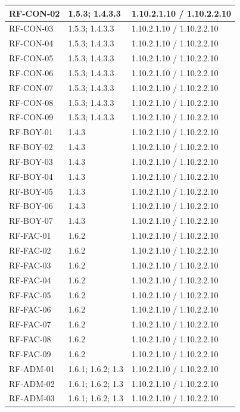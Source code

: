 \begin{longtable}{L{23mm}L{46mm}L{72mm}}
RF-CON-02 & 1.5.3; 1.4.3.3 & 1.10.2.1.10 / 1.10.2.2.10\\\hline
RF-CON-03 & 1.5.3; 1.4.3.3 & 1.10.2.1.10 / 1.10.2.2.10\\\hline
RF-CON-04 & 1.5.3; 1.4.3.3 & 1.10.2.1.10 / 1.10.2.2.10\\\hline
RF-CON-05 & 1.5.3; 1.4.3.3 & 1.10.2.1.10 / 1.10.2.2.10\\\hline
RF-CON-06 & 1.5.3; 1.4.3.3 & 1.10.2.1.10 / 1.10.2.2.10\\\hline
RF-CON-07 & 1.5.3; 1.4.3.3 & 1.10.2.1.10 / 1.10.2.2.10\\\hline
RF-CON-08 & 1.5.3; 1.4.3.3 & 1.10.2.1.10 / 1.10.2.2.10\\\hline
RF-CON-09 & 1.5.3; 1.4.3.3 & 1.10.2.1.10 / 1.10.2.2.10\\\hline
RF-BOY-01 & 1.4.3 & 1.10.2.1.10 / 1.10.2.2.10\\\hline
RF-BOY-02 & 1.4.3 & 1.10.2.1.10 / 1.10.2.2.10\\\hline
RF-BOY-03 & 1.4.3 & 1.10.2.1.10 / 1.10.2.2.10\\\hline
RF-BOY-04 & 1.4.3 & 1.10.2.1.10 / 1.10.2.2.10\\\hline
RF-BOY-05 & 1.4.3 & 1.10.2.1.10 / 1.10.2.2.10\\\hline
RF-BOY-06 & 1.4.3 & 1.10.2.1.10 / 1.10.2.2.10\\\hline
RF-BOY-07 & 1.4.3 & 1.10.2.1.10 / 1.10.2.2.10\\\hline
RF-FAC-01 & 1.6.2 & 1.10.2.1.10 / 1.10.2.2.10\\\hline
RF-FAC-02 & 1.6.2 & 1.10.2.1.10 / 1.10.2.2.10\\\hline
RF-FAC-03 & 1.6.2 & 1.10.2.1.10 / 1.10.2.2.10\\\hline
RF-FAC-04 & 1.6.2 & 1.10.2.1.10 / 1.10.2.2.10\\\hline
RF-FAC-05 & 1.6.2 & 1.10.2.1.10 / 1.10.2.2.10\\\hline
RF-FAC-06 & 1.6.2 & 1.10.2.1.10 / 1.10.2.2.10\\\hline
RF-FAC-07 & 1.6.2 & 1.10.2.1.10 / 1.10.2.2.10\\\hline
RF-FAC-08 & 1.6.2 & 1.10.2.1.10 / 1.10.2.2.10\\\hline
RF-FAC-09 & 1.6.2 & 1.10.2.1.10 / 1.10.2.2.10\\\hline
RF-ADM-01 & 1.6.1; 1.6.2; 1.3 & 1.10.2.1.10 / 1.10.2.2.10\\\hline
RF-ADM-02 & 1.6.1; 1.6.2; 1.3 & 1.10.2.1.10 / 1.10.2.2.10\\\hline
RF-ADM-03 & 1.6.1; 1.6.2; 1.3 & 1.10.2.1.10 / 1.10.2.2.10\\\hline

\end{longtable}
